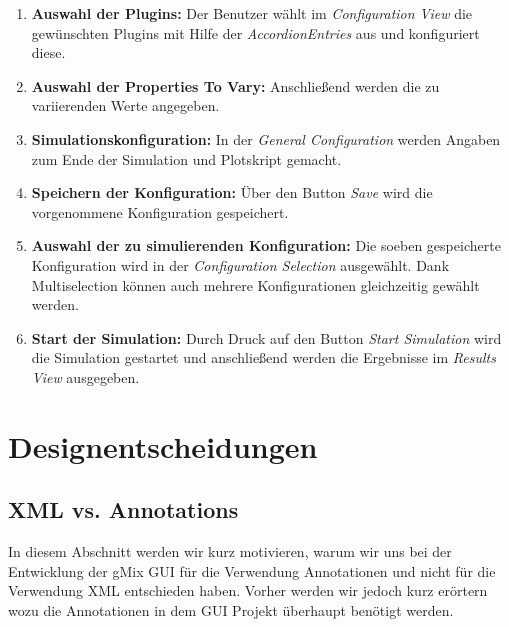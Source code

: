 \documentclass[a4paper, 11pt]{article} %
\begin{document}
\begin{enumerate}
\item \textbf{Auswahl der Plugins:} \newline Der Benutzer wählt im \emph{Configuration View} die gewünschten Plugins mit Hilfe der \emph{AccordionEntries} aus und konfiguriert diese.
\item \textbf{Auswahl der Properties To Vary:} \newline Anschließend werden die zu variierenden Werte angegeben.
\item \textbf{Simulationskonfiguration:} \newline In der \emph{General Configuration} werden Angaben zum Ende der Simulation und Plotskript gemacht.
\item \textbf{Speichern der Konfiguration:} \newline Über den Button \emph{Save} wird die vorgenommene Konfiguration gespeichert.
\item \textbf{Auswahl der zu simulierenden Konfiguration:} \newline Die soeben gespeicherte Konfiguration wird in der \emph{Configuration Selection} ausgewählt. Dank Multiselection können auch mehrere Konfigurationen gleichzeitig gewählt werden.
\item \textbf{Start der Simulation:} \newline Durch Druck auf den Button \emph{Start Simulation} wird die Simulation gestartet und anschließend werden die Ergebnisse im \emph{Results View} ausgegeben. 
\end{enumerate}

\section{Designentscheidungen} %
\label{sec:designentscheidungen}

\subsection{XML vs. Annotations} %
\label{sub:xml}
In diesem Abschnitt werden wir kurz motivieren, warum wir uns bei der Entwicklung der gMix GUI für die Verwendung Annotationen und nicht für die Verwendung XML entschieden haben. Vorher werden wir jedoch kurz erörtern wozu die Annotationen in dem GUI Projekt überhaupt benötigt werden.\\
\end{document}
